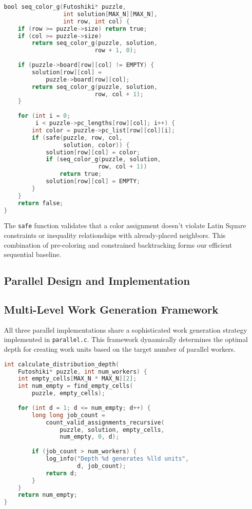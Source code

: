 \begin{lstlisting}[language=C, caption=Sequential backtracking core]
bool seq_color_g(Futoshiki* puzzle, 
                 int solution[MAX_N][MAX_N], 
                 int row, int col) {
    if (row >= puzzle->size) return true;
    if (col >= puzzle->size) 
        return seq_color_g(puzzle, solution, 
                          row + 1, 0);
    
    if (puzzle->board[row][col] != EMPTY) {
        solution[row][col] = 
            puzzle->board[row][col];
        return seq_color_g(puzzle, solution, 
                          row, col + 1);
    }
    
    for (int i = 0; 
         i < puzzle->pc_lengths[row][col]; i++) {
        int color = puzzle->pc_list[row][col][i];
        if (safe(puzzle, row, col, 
                 solution, color)) {
            solution[row][col] = color;
            if (seq_color_g(puzzle, solution, 
                           row, col + 1))
                return true;
            solution[row][col] = EMPTY;
        }
    }
    return false;
}
\end{lstlisting}

The \texttt{safe} function validates that a color assignment doesn't violate Latin Square constraints or inequality relationships with already-placed neighbors. This combination of pre-coloring and constrained backtracking forms our efficient sequential baseline.

\subsection{Parallel Design and Implementation}

\subsection{Multi-Level Work Generation Framework}
All three parallel implementations share a sophisticated work generation strategy implemented in \texttt{parallel.c}. This framework dynamically determines the optimal depth for creating work units based on the target number of parallel workers.

\begin{lstlisting}[language=C, caption=Dynamic depth calculation]
int calculate_distribution_depth(
    Futoshiki* puzzle, int num_workers) {
    int empty_cells[MAX_N * MAX_N][2];
    int num_empty = find_empty_cells(
        puzzle, empty_cells);
    
    for (int d = 1; d <= num_empty; d++) {
        long long job_count = 
            count_valid_assignments_recursive(
                puzzle, solution, empty_cells, 
                num_empty, 0, d);
        
        if (job_count > num_workers) {
            log_info("Depth %d generates %lld units", 
                     d, job_count);
            return d;
        }
    }
    return num_empty;
}
\end{lstlisting}

